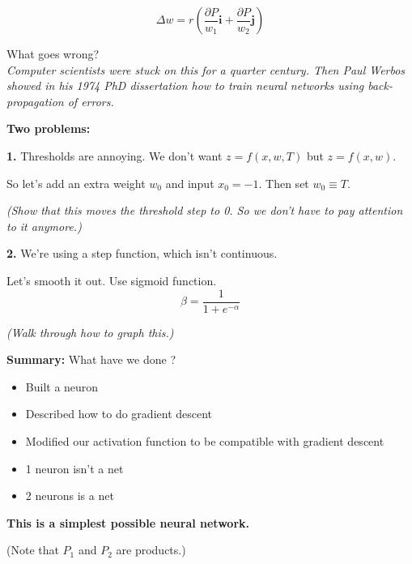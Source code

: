 \begin{displaymath}
  \Delta w = r\left( \frac{\partial P}{w_1} \mathbf{i} +
    \frac{\partial P}{w_2} \mathbf{j} \right)
\end{displaymath}

What goes wrong?\\

\textit{Computer scientists were stuck on this for a quarter century.
Then Paul Werbos showed in his 1974 PhD dissertation how to train
neural networks using back-propagation of errors.}

\textbf{Two problems:}

\textbf{\large 1. } Thresholds are annoying.  We don't want $z = f(x, w, T)$
but $z=f(x, w)$.

So let's add an extra weight $w_0$ and input $x_0=-1$.  Then set $w_0\equiv T$.

\textit{(Show that this moves the threshold step to 0.  So we don't
  have to pay attention to it anymore.)}

\textbf{\large 2. } We're using a step function, which isn't continuous.

Let's smooth it out.  Use sigmoid function.
\begin{displaymath}
  \beta = \frac{1}{1+e^{-\alpha}}
\end{displaymath}

\textit{(Walk through how to graph this.)}

\textbf{Summary: } What have we done ?
\begin{itemize}
\item Built a neuron
\item Described how to do gradient descent
\item Modified our activation function to be compatible with gradient descent
\end{itemize}


\begin{itemize}
\item 1 neuron isn't a net
\item 2 neurons is a  net
\end{itemize}

\textbf{This is a simplest possible neural network.}



(Note that $P_1$ and $P_2$ are products.)

